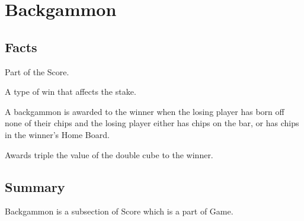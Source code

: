 \section{Backgammon}

\subsection{Facts}
\begin{dashed}
    \item Part of the Score.
    \item A type of win that affects the stake.
    \item A backgammon is awarded to the winner when the losing player has born off none of their chips and the losing player either has chips on the bar, or has chips in the winner's Home Board.
    \item Awards triple the value of the double cube to the winner.
\end{dashed}


\subsection{Summary}
Backgammon is a subsection of Score which is a part of Game.
